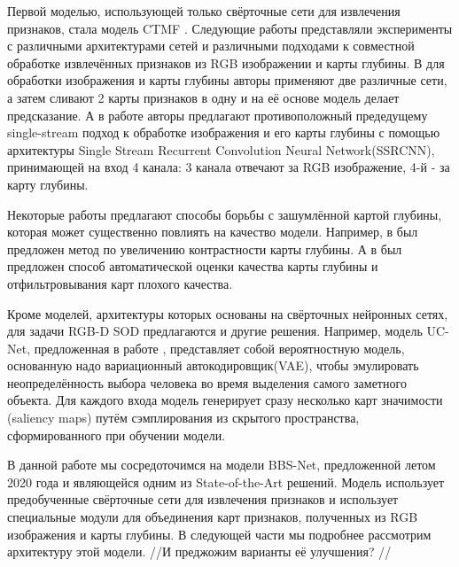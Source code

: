Первой моделью, использующей только свёрточные сети для извлечения признаков, стала модель CTMF \cite{CNNs-Based}. 
Следующие работы представляли эксперименты с различными архитектурами сетей и различными подходами 
к совместной обработке извлечённых признаков из RGB изображении и карты глубины. В \cite{Progressively} для обработки 
изображения и карты глубины авторы применяют две различные сети, а затем сливают 2 карты признаков в одну и 
на её основе модель делает предсказание. А в работе \cite{Single-Stream} авторы предлагают противоположный предедущему 
single-stream подход к обработке изображения и его карты глубины с помощью архитектуры Single Stream Recurrent Convolution Neural Network(SSRCNN),
принимающей на вход 4 канала: 3 канала отвечают за RGB изображение, 4-й - за карту глубины.

Некоторые работы предлагают способы борьбы с зашумлённой картой глубины, которая может существенно повлиять на качество модели.
Например, в \cite{Contrast} был предложен метод по увеличению контрастности карты глубины. А в \cite{Rethinking-RGBD} был предложен 
способ автоматической оценки качества карты глубины и отфильтровывания карт плохого качества.

Кроме моделей, архитектуры которых основаны на свёрточных нейронных сетях, для задачи RGB-D SOD предлагаются и другие решения. 
Например, модель UC-Net, предложенная в работе \cite{UC-Net}, представляет собой вероятностную модель, основанную надо
 вариационный автокодировщик(VAE), чтобы эмулировать неопределённость выбора человека во время выделения самого заметного объекта.
Для каждого входа модель генерирует сразу несколько карт значимости (saliency maps) путём сэмплирования из скрытого пространства,
сформированного при обучении модели.


В данной работе мы сосредоточимся на модели BBS-Net\cite{BBS}, предложенной летом 2020 года и являющейся одним из State-of-the-Art решений.
Модель использует предобученные свёрточные сети для извлечения признаков и использует специальные модули для объединения карт признаков,
полученных из RGB изображения и карты глубины. В следующей части мы подробнее рассмотрим архитектуру этой модели. //И преджожим варианты
её улучшения? //